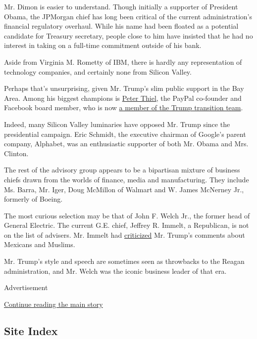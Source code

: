 Mr. Dimon is easier to understand. Though initially a supporter of
President Obama, the JPMorgan chief has long been critical of the
current administration's financial regulatory overhaul. While his name
had been floated as a potential candidate for Treasury secretary, people
close to him have insisted that he had no interest in taking on a
full-time commitment outside of his bank.

Aside from Virginia M. Rometty of IBM, there is hardly any
representation of technology companies, and certainly none from Silicon
Valley.

Perhaps that's unsurprising, given Mr. Trump's slim public support in
the Bay Area. Among his biggest champions is
\href{http://www.nytimes.com/2016/10/31/technology/peter-thiel-defends-his-most-contrarian-move-yet-supporting-trump.html}{Peter
Thiel}, the PayPal co-founder and Facebook board member, who is now
\href{https://www.bloomberg.com/news/articles/2016-11-11/peter-thiel-joins-trump-s-presidential-transition-team}{a
member of the Trump transition team}.

Indeed, many Silicon Valley luminaries have opposed Mr. Trump since the
presidential campaign. Eric Schmidt, the executive chairman of Google's
parent company, Alphabet, was an enthusiastic supporter of both Mr.
Obama and Mrs. Clinton.

The rest of the advisory group appears to be a bipartisan mixture of
business chiefs drawn from the worlds of finance, media and
manufacturing. They include Ms. Barra, Mr. Iger, Doug McMillon of
Walmart and W. James McNerney Jr., formerly of Boeing.

The most curious selection may be that of John F. Welch Jr., the former
head of General Electric. The current G.E. chief, Jeffrey R. Immelt, a
Republican, is not on the list of advisers. Mr. Immelt had
\href{http://www.vanityfair.com/news/2016/08/the-competitor-amazon-never-saw-coming}{criticized}
Mr. Trump's comments about Mexicans and Muslims.

Mr. Trump's style and speech are sometimes seen as throwbacks to the
Reagan administration, and Mr. Welch was the iconic business leader of
that era.

Advertisement

\protect\hyperlink{after-bottom}{Continue reading the main story}

\hypertarget{site-index}{%
\subsection{Site Index}\label{site-index}}

